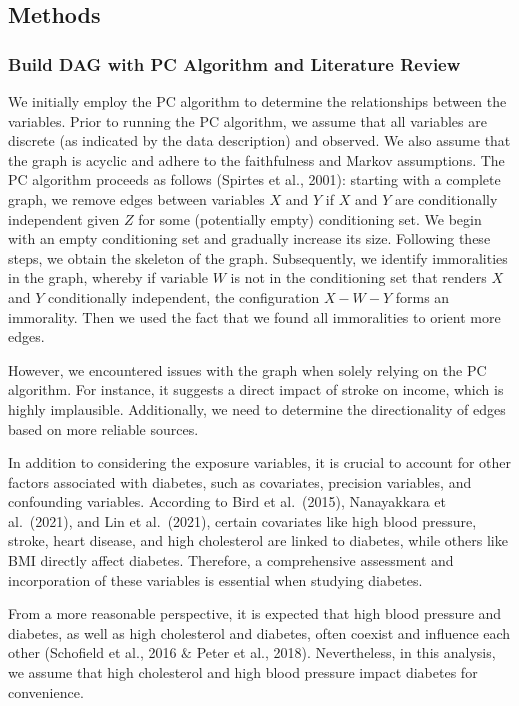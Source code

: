 \documentclass[
  12pt,
]{article}
\begin{document}
\hypertarget{methods}{%
\subsection{Methods}\label{methods}}

\hypertarget{build-dag-with-pc-algorithm-and-literature-review}{%
\subsubsection{Build DAG with PC Algorithm and Literature
Review}\label{build-dag-with-pc-algorithm-and-literature-review}}

We initially employ the PC algorithm to determine the relationships
between the variables. Prior to running the PC algorithm, we assume that
all variables are discrete (as indicated by the data description) and
observed. We also assume that the graph is acyclic and adhere to the
faithfulness and Markov assumptions. The PC algorithm proceeds as
follows (Spirtes et al., 2001): starting with a complete graph, we
remove edges between variables \(X\) and \(Y\) if \(X\) and \(Y\) are
conditionally independent given \(Z\) for some (potentially empty)
conditioning set. We begin with an empty conditioning set and gradually
increase its size. Following these steps, we obtain the skeleton of the
graph. Subsequently, we identify immoralities in the graph, whereby if
variable \(W\) is not in the conditioning set that renders \(X\) and
\(Y\) conditionally independent, the configuration \(X-W-Y\) forms an
immorality. Then we used the fact that we found all immoralities to
orient more edges.

However, we encountered issues with the graph when solely relying on the
PC algorithm. For instance, it suggests a direct impact of stroke on
income, which is highly implausible. Additionally, we need to determine
the directionality of edges based on more reliable sources.

In addition to considering the exposure variables, it is crucial to
account for other factors associated with diabetes, such as covariates,
precision variables, and confounding variables. According to Bird et
al.~(2015), Nanayakkara et al.~(2021), and Lin et al.~(2021), certain
covariates like high blood pressure, stroke, heart disease, and high
cholesterol are linked to diabetes, while others like BMI directly
affect diabetes. Therefore, a comprehensive assessment and incorporation
of these variables is essential when studying diabetes.

From a more reasonable perspective, it is expected that high blood
pressure and diabetes, as well as high cholesterol and diabetes, often
coexist and influence each other (Schofield et al., 2016 \(\&\) Peter et
al., 2018). Nevertheless, in this analysis, we assume that high
cholesterol and high blood pressure impact diabetes for convenience.
\end{document}
